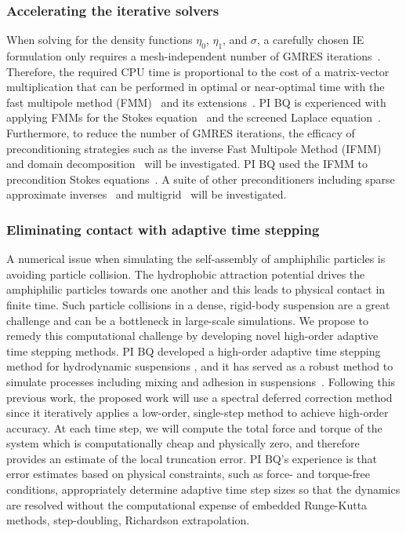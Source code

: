 \subsubsection{Accelerating the iterative solvers}
\label{subsec:NumericalIssues}

When solving for the density functions $\eta_0$, $\eta_1$, and $\sigma$,
a carefully chosen IE formulation only requires a mesh-independent
number of GMRES iterations~\cite{cam-ips-kel-mey-xue1996}. Therefore,
the required CPU time is proportional to the cost of a matrix-vector
multiplication that can be performed in optimal or near-optimal time
with the fast multipole method (FMM)~\cite{fmm5} and its
extensions~\cite{fmm1, fmm2, fmm3, fmm4, fmm6, fmm7, fmm8}. PI BQ is
experienced with applying FMMs for the Stokes
equation~\cite{qua-bir2014, bys-sha-qua2020} and the screened Laplace
equation~\cite{kro-qua2011, qua2011}. Furthermore, to reduce the number
of GMRES iterations, the efficacy of preconditioning strategies such as
the inverse Fast Multipole Method (IFMM)~\cite{cou-pou-dar2017} and
domain decomposition~\cite{che-bir2021} will be investigated. PI BQ used
the IFMM to precondition Stokes equations~\cite{qua-cou-dar2018}. A
suite of other preconditioners including sparse approximate
inverses~\cite{che2000} and multigrid~\cite{hem-sch1981, sch1982} will
be investigated.


\subsubsection{Eliminating contact with adaptive time stepping}
\label{subsec:timeStepping}

A numerical issue when simulating the self-assembly of amphiphilic
particles is avoiding particle collision. The hydrophobic attraction
potential drives the amphiphilic particles towards one another and this
leads to physical contact in finite time. Such particle collisions in a
dense, rigid-body suspension are a great challenge and can be a
bottleneck in large-scale simulations. We propose to remedy this
computational challenge by developing novel high-order adaptive time
stepping methods. PI BQ developed a high-order adaptive time
stepping method for hydrodynamic suspensions \cite{qua-bir2016}, and it
has served as a robust method to simulate processes including mixing and
adhesion in suspensions~\cite{qua-vee-you2019, kab-qua-bir2017}.
Following this previous work, the proposed work will use a spectral
deferred correction method~\cite{dut-gre-rok2000} since it iteratively
applies a low-order, single-step method to achieve high-order accuracy.
At each time step, we will compute the total force and torque of the
system which is computationally cheap and physically zero, and therefore
provides an estimate of the local truncation error. PI BQ's experience
is that error estimates based on physical constraints, such as force-
and torque-free conditions, appropriately determine adaptive time step
sizes so that the dynamics are resolved without the computational
expense of embedded Runge-Kutta methods, step-doubling, Richardson
extrapolation.


